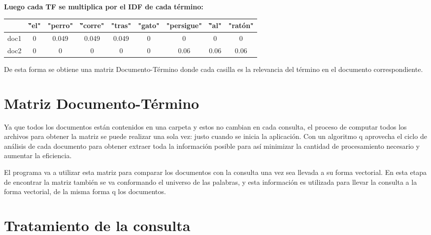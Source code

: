 \documentclass[10pt]{article}
\begin{document}
\textbf{Luego cada TF se multiplica por el IDF de cada término:}
\begin{table}[h]
	\centering
	\bfseries \textcolor[RGB]{50,50,50}{
		\begin{tabular}{|c|c|c|c|c|c|c|c|c|}
			\hline
			\rowcolor[RGB]{200,200,200}
			& \""el" & "perro" & \""corre" & "tras" & "gato" & "persigue" & \""al" & "ratón" \\
			\hline
			\rowcolor[RGB]{200,200,200}
			doc1 & 0 & 0.049 & 0.049 & 0.049 & 0 & 0 & 0 & 0 \\
			\hline
			\rowcolor[RGB]{200,200,200}
			doc2 & 0 & 0 & 0 & 0 & 0 & 0.06 & 0.06 & 0.06 \\
			\hline
		\end{tabular}
	}
\end{table}

De esta forma se obtiene una matriz Documento-Término donde cada casilla es la relevancia del término en el documento correspondiente.

\section{Matriz Documento-Término}
\label{sec:matrix}

Ya que todos los documentos están contenidos en una carpeta y estos no cambian en cada consulta, el proceso de computar todos los archivos para obtener la
matriz se puede realizar una sola vez: justo cuando se inicia la aplicación. Con un algoritmo q aprovecha el ciclo de análisis de cada documento para obtener extraer toda la información posible para así minimizar la cantidad de procesamiento necesario y aumentar la eficiencia. 

El programa va a utilizar esta matriz para comparar los documentos con la consulta una vez sea llevada a su forma vectorial. En esta etapa de encontrar la matriz también se va conformando el universo de las palabras, y esta información es utilizada para llevar la consulta a la forma vectorial, de la misma forma q los documentos.

\section{Tratamiento de la consulta}
\label{sec:query}
\end{document}
